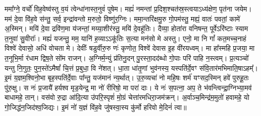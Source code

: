 ममा᳚ग्ने॒ वर्चो॑ विह॒वेष्व॑स्तु व॒यं त्वेन्धा॑नास्त॒नुवं॑ पुषेम। मह्यं॑ नमन्तां प्र॒दिश॒श्चत॑स्र॒स्त्वयाऽध्य॑क्षेण॒ पृत॑ना जयेम। मम॑ दे॒वा वि॑ह॒वे स॑न्तु॒ सर्व॒ इन्द्रा॑वन्तो म॒रुतो॒ विष्णु॑र॒ग्निः। ममा॒न्तरि॑क्षमु॒रु गो॒पम॑स्तु॒ मह्यं॒ वातः॑ पवतां॒ कामे॑ अ॒स्मिन्। मयि॑ दे॒वा द्रवि॑ण॒मा य॑जन्तां॒ मय्या॒शीर॑स्तु॒ मयि॑ दे॒वहू॑तिः। दैव्या॒ होता॑रा वनिषन्त॒ पूर्वेऽरि॑ष्टाः स्याम त॒नुवा॑ सु॒वीराः᳚। मह्यं॑ यजन्तु॒ मम॒ यानि॑ ह॒व्याऽऽकू॑तिः स॒त्या मन॑सो मे अस्तु। एनो॒ मा नि गां᳚ कत॒मच्च॒नाहं विश्वे॑ देवासो॒ अधि॑ वोचता मे। देवीः᳚ षडुर्वीरु॒रु णः॑ कृणोत॒ विश्वे॑ देवास इ॒ह वी॑रयध्वम्। मा हा᳚स्महि प्र॒जया॒ मा त॒नूभि॒र्मा र॑धाम द्विष॒ते सो॑म राजन्। अ॒ग्निर्म॒न्युं प्र॑तिनु॒दन् पु॒रस्ता॒दद॑ब्धो गो॒पाः परि॑ पाहि न॒स्त्वम्। प्र॒त्यञ्चो॑ यन्तु नि॒गुतः॒ पुन॒स्ते॑ऽमैषां᳚ चि॒त्तं प्र॒बुधा॒ वि ने॑शत्। धा॒ता धा॑तृ॒णां भुव॑नस्य॒ यस्पति॑र्दे॒वꣳ स॑वि॒तार॑मभिमाति॒षाऽहम्᳚। इ॒मं य॒ज्ञम॒श्विनो॒भा बृह॒स्पति॑र्दे॒वाः पा᳚न्तु॒ यज॑मानं न्य॒र्थात्। उ॒रु॒व्यचा॑ नो महि॒षः शर्म॑ यꣳसद॒स्मिन् हवे॑ पुरुहू॒तः पु॑रु॒क्षु। स नः॑ प्र॒जायै॑ हर्यश्व मृड॒येन्द्र॒ मा नो॑ रीरिषो॒ मा परा॑ दाः। ये नः॑ स॒पत्ना॒ अप॒ ते भ॑वन्त्विन्द्रा॒ग्निभ्या॒मव॑ बाधामहे॒ तान्। वस॑वो रु॒द्रा आ॑दि॒त्या उ॑परि॒स्पृशं॑ मो॒ग्रं चेत्ता॑रमधिरा॒जम॑क्रन्। अ॒र्वाञ्च॒मिन्द्र॑म॒मुतो॑ हवामहे॒ यो गो॒जिद्ध॑न॒जिद॑श्व॒जिद्यः। इ॒मं नो॑ य॒ज्ञं वि॑ह॒वे जु॑षस्वा॒स्य कु॑र्मो हरिवो मे॒दिनं॑ त्वा॥

